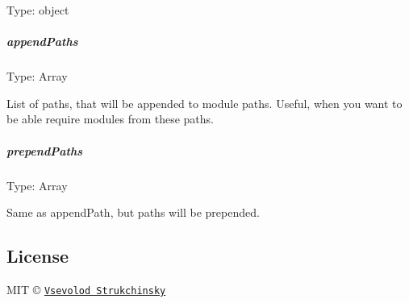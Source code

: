 Type\+: {\ttfamily object}

\subparagraph*{append\+Paths}

Type\+: {\ttfamily Array}

List of {\ttfamily paths}, that will be appended to module {\ttfamily paths}. Useful, when you want to be able require modules from these paths.

\subparagraph*{prepend\+Paths}

Type\+: {\ttfamily Array}

Same as {\ttfamily append\+Path}, but paths will be prepended.

\subsection*{License}

M\+IT © \href{http://github.com/floatdrop}{\tt Vsevolod Strukchinsky} 